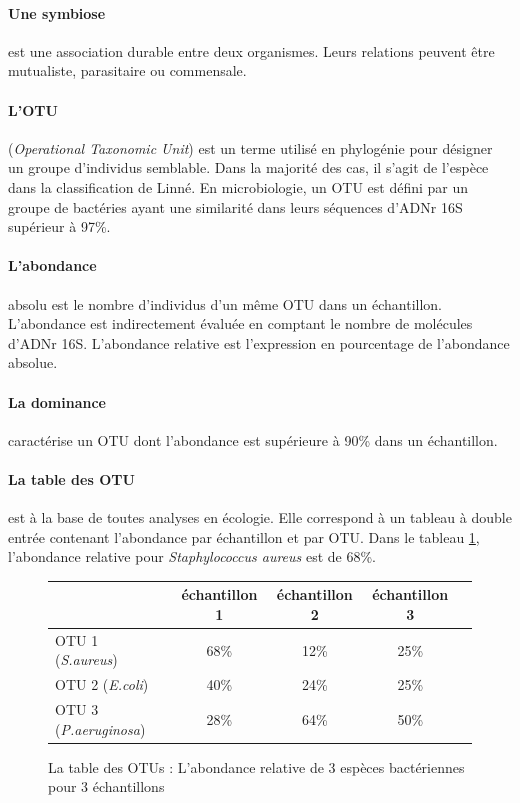 \documentclass[12pt,a4paper]{article}
\begin{document}
\paragraph{Une symbiose} est une association durable entre deux organismes. Leurs relations peuvent être mutualiste, parasitaire ou commensale.


\paragraph{L'OTU}(\textit{Operational Taxonomic Unit}) est un terme utilisé en phylogénie pour désigner un groupe d’individus semblable. Dans la majorité des cas, il s'agit de l'espèce dans la classification de Linné.
En microbiologie, un OTU est défini par un groupe de bactéries ayant une similarité dans leurs séquences d'ADNr 16S supérieur à 97\%.

\paragraph{L'abondance} absolu est le nombre d'individus d'un même OTU dans un échantillon. L'abondance est indirectement évaluée en comptant le nombre de molécules d'ADNr 16S.
L’abondance relative est l'expression en pourcentage de l'abondance absolue.

\paragraph{La dominance} caractérise un OTU dont l'abondance est supérieure à 90\% dans un échantillon.


\paragraph{La table des OTU} est à la base de toutes analyses en écologie. Elle correspond à un tableau à double entrée contenant l’abondance par échantillon et par OTU. Dans le tableau \ref{OTUTABLE}, l'abondance relative pour \textit{Staphylococcus aureus} est de 68\%.

\begin{figure}[h]
\begin{center}
\begin{tabular}{|l|c|c|c|c}
  \hline
   & échantillon 1 & échantillon 2 & échantillon 3  \\
  \hline
  OTU 1 (\textit{S.aureus}) & 68\% & 12\% & 25\% \\
  OTU 2 (\textit{E.coli})& 40\% & 24\% & 25\% \\
  OTU 3 (\textit{P.aeruginosa}) & 28\% & 64\% & 50\% \\

  \hline
\end{tabular}
\end{center}
\caption{La table des OTUs : L'abondance relative de 3 espèces bactériennes pour 3 échantillons}
\label{OTUTABLE}
\end{figure}
\end{document}
